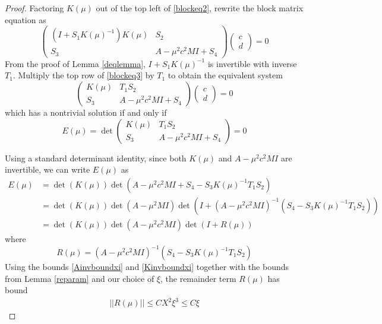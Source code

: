 \documentclass[thesis.tex]{subfiles}
\begin{document}
\begin{lemma}
\begin{proof}
Factoring $K(\mu)$ out of the top left of \cref{blockeq2}, rewrite the block matrix equation as
\begin{equation}\label{blockeq3}
\begin{pmatrix}
(I + S_1 K(\mu)^{-1})K(\mu) & S_2 \\
S_3 & A - \mu^2 c^2 MI + S_4
\end{pmatrix}
\begin{pmatrix} c \\ d \end{pmatrix} = 0
\end{equation}
From the proof of Lemma \ref{deqlemma}, $I + S_1 K(\mu)^{-1}$ is invertible with inverse $T_1$. Multiply the top row of \eqref{blockeq3} by $T_1$ to obtain the equivalent system
\begin{equation}\label{blockeq4}
\begin{pmatrix}
K(\mu) & T_1 S_2 \\
S_3 & A - \mu^2 c^2 MI + S_4
\end{pmatrix}
\begin{pmatrix} c \\ d \end{pmatrix} = 0
\end{equation}
which has a nontrivial solution if and only if
\begin{equation}\label{countdefE}
E(\mu) = \det 
\begin{pmatrix}
K(\mu) & T_1 S_2 \\
S_3 & A - \mu^2 c^2 MI + S_4
\end{pmatrix} = 0
\end{equation}

Using a standard determinant identity, since both $K(\mu)$ and $A - \mu^2 c^2 M I$ are invertible, we can write $E(\mu)$ as
\begin{align*}
E(\mu) &= \det(K(\mu))
\det ( A - \mu^2 c^2 MI + S_4 - S_3 K(\mu)^{-1}T_1 S_2 ) \\
&= \det(K(\mu))\det(A - \mu^2 MI)
\det ( I + (A - \mu^2 c^2 MI)^{-1}(S_4 - S_3 K(\mu)^{-1}T_1 S_2) ) \\
&= \det(K(\mu))\det(A - \mu^2 c^2 MI)\det(I + R(\mu))
\end{align*}
where
\[
R(\mu) = (A - \mu^2 c^2 MI)^{-1}(S_4 - S_3 K(
\mu)^{-1}T_1 S_2)
\]
Using the bounds \eqref{Ainvboundxi} and \eqref{Kinvboundxi} together with the bounds from Lemma \ref{reparam} and our choice of $\xi$, the remainder term $R(\mu)$ has bound
\begin{align*}
||R(\mu)|| \leq C X^2 \xi^3 \leq C \xi
\end{align*}


\end{proof}
\end{lemma}
\end{document}
